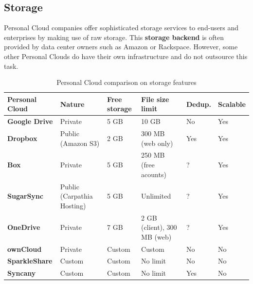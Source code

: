 \subsection{Storage}

Personal Cloud companies offer sophisticated storage services to end-users and enterprises by making use of raw storage. This \textbf{storage backend} is often provided by data center owners such as Amazon or Rackspace. However, some other Personal Clouds do have their own infrastructure and do not outsource this task.

\begin{table}
\begin{center}
    \begin{tabular}{ | p{3cm} | p{1.8cm} | p{1.5cm} | p{2.6cm} | p{1.3cm} | p{1.5cm} | }
    \hline
    \rowcolor[gray]{0.8}

	\textbf{Personal Cloud} &
	\textbf{Nature} &
	\textbf{Free storage} &
	\textbf{File size limit} & 
	\textbf{Dedup.} & 
	\textbf{Scalable} \\ \hline

	\textbf{Google Drive} &
	Private &
	5 GB &
	10 GB &
	No &
	Yes \\ \hline

	\textbf{Dropbox} &
	Public (Amazon S3) &
	2 GB &
	300 MB (web only) &
	Yes &
	Yes \\ \hline
	
	
	\textbf{Box} &
	Private &
	5 GB & 
	250 MB (free acounts) &
	? &
	Yes \\ \hline
	
	\textbf{SugarSync} & 
	Public (Carpathia Hosting) &
	5 GB &
	Unlimited &
	? &
	Yes \\ \hline
	
	\textbf{OneDrive} & 
	Private &
	7 GB &
	2 GB (client), 300 MB (web) &
	? &
	Yes \\ \hline
	
	\textbf{ownCloud} &
	Private &
	Custom &
	Custom &
	No &
	No \\ \hline
	
	\textbf{SparkleShare} &
	Custom &
	Custom &
	No limit &
	No &
	No \\ \hline
	
	\textbf{Syncany} &
	Custom &
	Custom &
	No limit &
	Yes &
	No \\ \hline

    \end{tabular}
    \\[10pt]
    \caption{Personal Cloud comparison on storage features}
    \label{tab:pc_storage}
\end{center}
\end{table}

